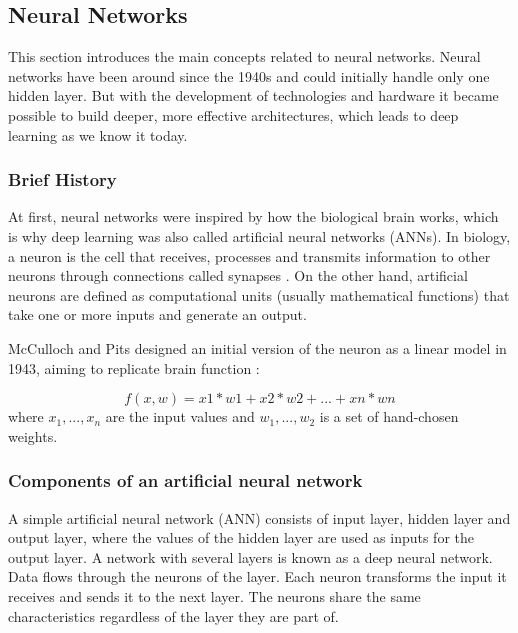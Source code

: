 \subsection{Neural Networks}
This section introduces the main concepts related to neural networks. Neural networks have been around since the 1940s and could initially handle only one hidden layer. But with the development of technologies and hardware it became possible to build deeper, more effective architectures, which leads to deep learning as we know it today. \par



\subsubsection{Brief History}


At first, neural networks were inspired by how the biological brain works, which is why deep learning was also called artificial neural networks (ANNs)\cite{Goodfellow-et-al-2016}. In biology, a neuron is the cell that receives, processes and transmits information to other neurons through connections called synapses \cite{neuron}. On the other hand, artificial neurons are defined as computational units (usually mathematical functions) that take one or more inputs and generate an output. \par

McCulloch and Pits designed an initial version of the neuron as a linear model in 1943, aiming to replicate brain function \cite{REF:11}:


\begin{equation}
f(x,w)=x1*w1 +x2*w2 +...+xn*wn
\end{equation}
where $x_1, ..., x_n$ are the input values and $w_1, ..., w_2$ is a set of hand-chosen weights.

\subsubsection{Components of an artificial neural network}

A simple artificial neural network (ANN) consists of input layer, hidden layer and output layer, where the values of the hidden layer are used as inputs for the output layer. A network with several layers is known as a deep neural network. Data flows through the neurons of the layer. Each neuron transforms the input it receives and sends it to the next layer. The neurons share the same characteristics regardless of the layer they are part of. \par



